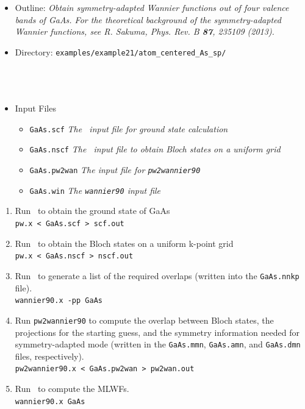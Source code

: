 \documentclass[a4paper,11pt,twoside]{article}
\begin{document}
\begin{itemize}
\item{Outline: \it{Obtain symmetry-adapted Wannier functions out of four valence bands of GaAs. 
For the theoretical background of the symmetry-adapted Wannier functions, see R. Sakuma,  Phys. Rev. B {\bf 87}, 235109 (2013).}}
\item{Directory: {\tt examples/example21/atom\_centered\_As\_sp/} \\
\phantom{Directory: }{\tt examples/example21/atom\_centered\_Ga\_p/}    \\
\phantom{Directory: }{\tt examples/example21/atom\_centered\_Ga\_s/}    \\
\phantom{Directory: }{\tt examples/example21/atom\_centered\_Ga\_sp/}    \\
\phantom{Directory: }{\tt examples/example21/bond\_centered/}    
}
\item{Input Files}
\begin{itemize}
\item{ {\tt GaAs.scf}  {\it The \pwscf\ input file for ground state
    calculation}} 
\item{ {\tt GaAs.nscf}  {\it The \pwscf\ input file to obtain Bloch
    states on a uniform grid}} 
\item{ {\tt GaAs.pw2wan}  {\it The input file for {\tt pw2wannier90}}}
\item{ {\tt GaAs.win}  {\it The {\tt wannier90} input file}}
\end{itemize}
\end{itemize}

\begin{enumerate}
\item Run \pwscf\ to obtain the ground state of GaAs\\
{\tt pw.x < GaAs.scf > scf.out}

\item Run \pwscf\ to obtain the Bloch states on a uniform k-point grid\\
{\tt pw.x < GaAs.nscf > nscf.out}

\item Run \wannier\ to generate a list of the required overlaps (written
  into the {\tt GaAs.nnkp} file).\\ 
{\tt wannier90.x -pp GaAs}

\item Run {\tt pw2wannier90} to compute the overlap between Bloch
  states, the projections for the starting guess, and the symmetry information needed for symmetry-adapted mode (written in the
  {\tt GaAs.mmn}, {\tt GaAs.amn}, and {\tt GaAs.dmn} files, respectively).\\  
{\tt pw2wannier90.x < GaAs.pw2wan > pw2wan.out}

\item Run \wannier\ to compute the MLWFs.\\
{\tt wannier90.x GaAs}
\end{enumerate}
\end{document}
